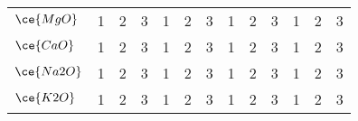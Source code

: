 \begin{table*}[]
{\begin{tabular}{lcccccccccccc}
$\ce{MgO}$   & \multicolumn{1}{c}{1}     & \multicolumn{1}{c}{2}      & \multicolumn{1}{c}{3}     & \multicolumn{1}{c}{1}     & \multicolumn{1}{c}{2}      & \multicolumn{1}{c}{3}     & \multicolumn{1}{c}{1}     & \multicolumn{1}{c}{2}      & \multicolumn{1}{c}{3}     & \multicolumn{1}{c}{1}     & \multicolumn{1}{c}{2}      & 3                          \\
$\ce{CaO}$   & \multicolumn{1}{c}{1}     & \multicolumn{1}{c}{2}      & \multicolumn{1}{c}{3}     & \multicolumn{1}{c}{1}     & \multicolumn{1}{c}{2}      & \multicolumn{1}{c}{3}     & \multicolumn{1}{c}{1}     & \multicolumn{1}{c}{2}      & \multicolumn{1}{c}{3}     & \multicolumn{1}{c}{1}     & \multicolumn{1}{c}{2}      & 3                          \\
$\ce{Na2O}$  & \multicolumn{1}{c}{1}     & \multicolumn{1}{c}{2}      & \multicolumn{1}{c}{3}     & \multicolumn{1}{c}{1}     & \multicolumn{1}{c}{2}      & \multicolumn{1}{c}{3}     & \multicolumn{1}{c}{1}     & \multicolumn{1}{c}{2}      & \multicolumn{1}{c}{3}     & \multicolumn{1}{c}{1}     & \multicolumn{1}{c}{2}      & 3                          \\
$\ce{K2O}$   & \multicolumn{1}{c}{1}     & \multicolumn{1}{c}{2}      & \multicolumn{1}{c}{3}     & \multicolumn{1}{c}{1}     & \multicolumn{1}{c}{2}      & \multicolumn{1}{c}{3}     & \multicolumn{1}{c}{1}     & \multicolumn{1}{c}{2}      & \multicolumn{1}{c}{3}     & \multicolumn{1}{c}{1}     & \multicolumn{1}{c}{2}      & 3                          \\
\bottomrule
\end{tabular}%
}
\end{table*}